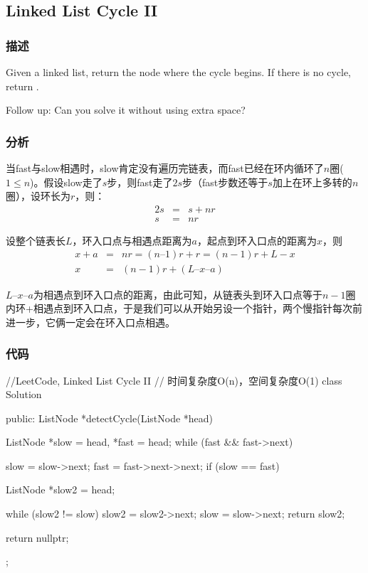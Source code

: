 \subsection{Linked List Cycle II}
\label{sec:Linked-List-Cycle-II}


\subsubsection{描述}
Given a linked list, return the node where the cycle begins. If there is no cycle, return .

Follow up:
Can you solve it without using extra space?


\subsubsection{分析}
当fast与slow相遇时，slow肯定没有遍历完链表，而fast已经在环内循环了$n$圈($1 \leq n$)。假设slow走了$s$步，则fast走了$2s$步（fast步数还等于$s$加上在环上多转的$n$圈），设环长为$r$，则：
\begin{eqnarray}
2s &=& s + nr \nonumber \\
s &=& nr \nonumber
\end{eqnarray}

设整个链表长$L$，环入口点与相遇点距离为$a$，起点到环入口点的距离为$x$，则
\begin{eqnarray}
x + a &=& nr = (n – 1)r +r = (n-1)r + L - x \nonumber \\
x &=& (n-1)r + (L – x – a) \nonumber
\end{eqnarray}

$L – x – a$为相遇点到环入口点的距离，由此可知，从链表头到环入口点等于$n-1$圈内环+相遇点到环入口点，于是我们可以从开始另设一个指针，两个慢指针每次前进一步，它俩一定会在环入口点相遇。


\subsubsection{代码}
\begin{Code}
//LeetCode, Linked List Cycle II
// 时间复杂度O(n)，空间复杂度O(1)
class Solution {
public:
    ListNode *detectCycle(ListNode *head) {
        ListNode *slow = head, *fast = head;
        while (fast && fast->next) {
            slow = slow->next;
            fast = fast->next->next;
            if (slow == fast) {
                ListNode *slow2 = head;

                while (slow2 != slow) {
                    slow2 = slow2->next;
                    slow = slow->next;
                }
                return slow2;
            }
        }
        return nullptr;
    }
};
\end{Code}


